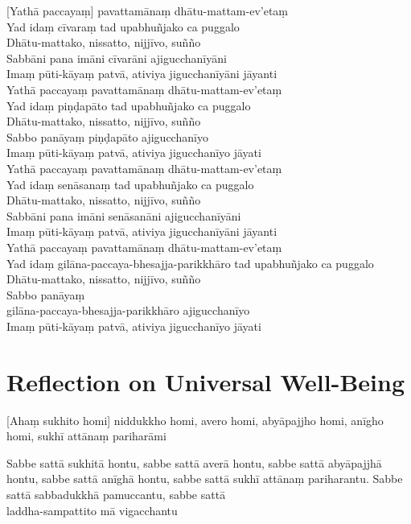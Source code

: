 [Yathā paccayaṃ] pavattamānaṃ dhātu-mattam-ev'etaṃ\\
Yad idaṃ cīvaraṃ tad upabhuñjako ca puggalo\\
Dhātu-mattako, nissatto, nijjīvo, suñño\\
Sabbāni pana imāni cīvarāni ajigucchanīyāni\\
Imaṃ pūti-kāyaṃ patvā, ativiya jigucchanīyāni jāyanti\\
Yathā paccayaṃ pavattamānaṃ dhātu-mattam-ev'etaṃ\\
Yad idaṃ piṇḍapāto tad upabhuñjako ca puggalo\\
Dhātu-mattako, nissatto, nijjīvo, suñño\\
Sabbo panāyaṃ piṇḍapāto ajigucchanīyo\\
Imaṃ pūti-kāyaṃ patvā, ativiya jigucchanīyo jāyati\\
Yathā paccayaṃ pavattamānaṃ dhātu-mattam-ev'etaṃ\\
Yad idaṃ senāsanaṃ tad upabhuñjako ca puggalo\\
Dhātu-mattako, nissatto, nijjīvo, suñño\\
Sabbāni pana imāni senāsanāni ajigucchanīyāni\\
Imaṃ pūti-kāyaṃ patvā, ativiya jigucchanīyāni jāyanti\\
Yathā paccayaṃ pavattamānaṃ dhātu-mattam-ev'etaṃ\\
Yad idaṃ gilāna-paccaya-bhesajja-parikkhāro tad upabhuñjako ca puggalo\\
Dhātu-mattako, nissatto, nijjīvo, suñño\\
Sabbo panāyaṃ\\
gilāna-paccaya-bhesajja-parikkhāro ajigucchanīyo\\
Imaṃ pūti-kāyaṃ patvā, ativiya jigucchanīyo jāyati

\enlargethispage{\baselineskip}

\section{Reflection on Universal Well-Being}

\begin{leader}
\end{leader}


[Ahaṃ sukhito homi] niddukkho homi, avero homi, abyāpajjho homi, anīgho homi,
sukhī attānaṃ pariharāmi

Sabbe sattā sukhitā hontu, sabbe sattā averā hontu, sabbe sattā abyāpajjhā
hontu, sabbe sattā anīghā hontu, sabbe sattā sukhī attānaṃ pariharantu. Sabbe
sattā sabbadukkhā pamuccantu, sabbe sattā\\
laddha-sampattito mā vigacchantu

